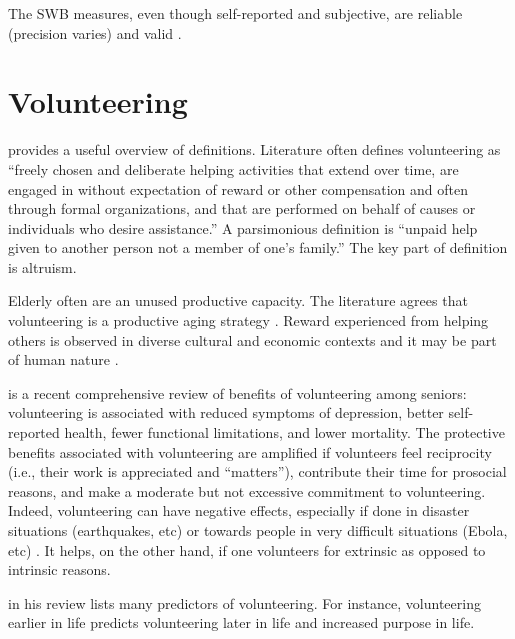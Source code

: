 \documentclass[10pt, letterpaper]{article}
\begin{document}
\begin{spacing}{1.4}
The SWB measures, even though self-reported and
 subjective, are  reliable (precision varies) %
 and valid \citep{myers00,ditella06m,diener09}. 


\section*{Volunteering}

\citet[][p. 177]{wilson12B} provides a useful overview of definitions. 
 Literature often defines volunteering as
 ``freely chosen and deliberate helping activities that
extend over time, are engaged in without expectation of reward or other
compensation
and often through formal organizations, and that are performed on behalf of
causes or individuals who desire assistance.'' A parsimonious definition is ``unpaid help given
to another person not a member of one's family.'' The key part of definition is altruism.

Elderly often are  an unused productive capacity.
The literature agrees that volunteering is a productive aging strategy
\citep[e.g.,][]{wilson12B,hank09}. 
 Reward experienced from helping others is observed in diverse cultural and
 economic contexts and it may be part of human nature \citep{aknin13}. 

\citet{anderson14} is a recent comprehensive review of benefits of
volunteering among seniors: volunteering is associated with reduced symptoms of
depression, better self-reported health, fewer functional limitations, and lower
mortality. The protective benefits associated with volunteering are amplified if
volunteers feel reciprocity (i.e., their work is appreciated and ``matters''), contribute their
time for prosocial reasons, and make a moderate but not excessive commitment to
volunteering. Indeed, volunteering can have negative effects, especially if done
in disaster situations (earthquakes, etc) or towards people in very difficult
situations (Ebola, etc) \citep{wilson12B}.
It helps, on the other hand, if one volunteers for extrinsic as opposed to intrinsic reasons. 

\citet{wilson12B} in his review lists many predictors of volunteering. For
instance, volunteering
earlier in life predicts volunteering later in life and increased purpose in
life. 



\end{spacing}
\end{document}
